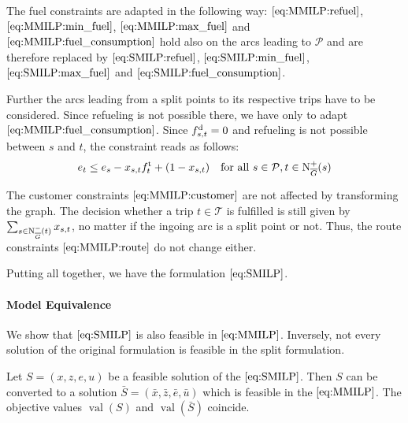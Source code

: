 
The fuel constraints are adapted in the following way: $\eqref{eq:MMILP:refuel}$, $\eqref{eq:MMILP:min_fuel}$, $\eqref{eq:MMILP:max_fuel}$ and $\eqref{eq:MMILP:fuel_consumption}$ hold also on the arcs leading to $\mathcal{P}$ and are therefore replaced by $\eqref{eq:SMILP:refuel}$, $\eqref{eq:SMILP:min_fuel}$, $\eqref{eq:SMILP:max_fuel}$ and $\eqref{eq:SMILP:fuel_consumption}$.

Further the arcs leading from a split points to its respective trips have to be considered. Since refueling is not possible there, we have only to adapt $\eqref{eq:MMILP:fuel_consumption}$. Since $f^{\operatorname{d}}_{s,t} = 0$ and refueling is not possible between $s$ and $t$, the constraint reads as follows:
\begin{align}
	e_t \leq e_s - x_{s,t}f^{\operatorname{t}}_t + \left(1-x_{s,t}\right) && \text{for all } s\in \mathcal{P},t\in\operatorname{N}_{\overline{G}}^+(s) \label{eq:SMILP:fuel_splitpoint}
\end{align}

The customer constraints $\eqref{eq:MMILP:customer}$ are not affected by transforming the graph. The decision whether a trip $t\in\mathcal{T}$ is fulfilled is still given by $\sum_{s\in\operatorname{N}_{\overline{G}}^-(t)} x_{s,t}$, no matter if the ingoing arc is a split point or not. Thus, the route constraints $\eqref{eq:MMILP:route}$ do not change either.

Putting all together, we have the formulation $\eqref{eq:SMILP}$.

\paragraph{Model Equivalence} \parfill

We show that $\eqref{eq:SMILP}$ is also feasible in $\eqref{eq:MMILP}$. Inversely, not every solution of the original formulation is feasible in the split formulation.

\begin{theorem}
\label{thm:equivalence_SMILP_MMILP}

Let ${S=(x,z,e,u)}$ be a feasible solution of the $\eqref{eq:SMILP}$. Then $S$ can be converted to a solution ${\bar{S}=\left(\bar{x},\bar{z},\bar{e},\bar{u}\right)}$ which is feasible in the $\eqref{eq:MMILP}$. The objective values $\operatorname{val}(S)$ and $\operatorname{val}(\bar{S})$ coincide.

\end{theorem}

